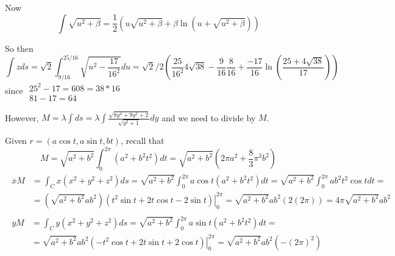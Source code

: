 \documentclass[twoside]{amsart}
\theoremstyle{plain}
\theoremstyle{definition}
\newcommand{\exercisehead}[1]
  {
   \noindent{\small\bf Exercise #1.}
   \smallskip}
\begin{document}
Now
\[
\int \sqrt{ u^2 + \beta} = \frac{1}{2} ( u \sqrt{ u^2 + \beta} + \beta \ln{ ( u + \sqrt{ u^2 + \beta} ) } )
\]

So then 
\[
\int z ds = \sqrt{2} \int_{9/16}^{25/16} \sqrt{ u^2 - \frac{17 }{16^2} } du  = \sqrt{ 2}/2 \left( \frac{25}{16^2} 4 \sqrt{38} - \frac{9}{16} \frac{8}{16} + \frac{-17}{16} \ln{ \left( \frac{ 25+ 4 \sqrt{38} }{ 17}  \right) } \right)
\]
since $\begin{aligned} 25^2 -17 = 608 = 38 * 16 \\ 81 - 17 =64 \end{aligned}$

However, $M = \lambda \int ds = \lambda \int \frac{ \sqrt{ 8y^4 + 9y^2 + 2 } }{ \sqrt{ y^2 + 1 } } dy $  and we need to divide by $M$.  

\exercisehead{15} Given $r=(a\cos{t},a\sin{t},bt)$, recall that 
\[
M = \sqrt{ a^2 + b^2 } \int_0^{2\pi} (a^2 + b^2 t^2) dt = \sqrt{ a^2 + b^2 }(2\pi a^2 + \frac{8}{3} \pi^3 b^2)
\]
\[
\begin{gathered}
  \begin{aligned}
  \overline{x}M & = \int_C x (x^2 + y^2 + z^2) ds = \sqrt{ a^2 + b^2 } \int_0^{2\pi} a \cos{t} (a^2 + b^2 t^2) dt = \sqrt{ a^2 + b^2} \int_0^{2\pi} ab^2 t^2 \cos{t} dt = \\
  & = \left( \sqrt{ a^2 +b^2 } ab^2 \right) \left. (t^2 \sin{t} + 2t \cos{t} - 2\sin{t} ) \right|_0^{2\pi} = \sqrt{ a^2 + b^2} ab^2 (2 (2\pi)) = \boxed{ 4 \pi \sqrt{a^2 + b^2 } ab^2 }
  \end{aligned} \\
  \begin{aligned}
    \overline{y}M & = \int_C y (x^2 + y^2 + z^2)ds = \sqrt{ a^2 +b^2 } \int_0^{2\pi} a\sin{t} (a^2 + b^2 t^2)dt = \\
    & = \sqrt{ a^2 + b^2} ab^2 \left. \left( -t^2 \cos{t} + 2t \sin{t} + 2\cos{t} \right) \right|_0^{2\pi} = \boxed{ \sqrt{ a^2 + b^2 }ab^2 (-(2\pi)^2) }
\end{aligned}
\end{gathered}
\]
\end{document}
